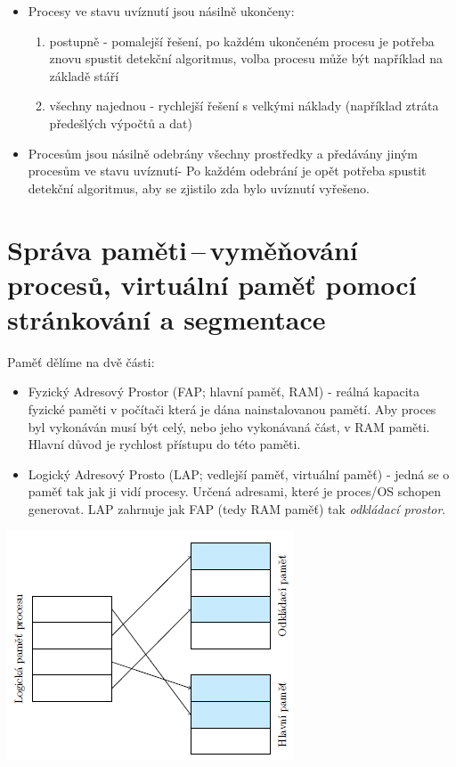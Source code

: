 \begin{itemize}
    \item Procesy ve stavu uvíznutí jsou násilně ukončeny: 
    \begin{enumerate}
        \item postupně - pomalejší řešení, po každém ukončeném procesu je potřeba znovu spustit detekční algoritmus, volba procesu může být například na základě stáří
        \item všechny najednou - rychlejší řešení s velkými náklady (například ztráta předešlých výpočtů a dat)
    \end{enumerate}
    
    \item Procesům jsou násilně odebrány všechny prostředky a předávány jiným procesům ve stavu uvíznutí- Po každém odebrání je opět potřeba spustit detekční algoritmus, aby se zjistilo zda bylo uvíznutí vyřešeno.
\end{itemize}


\newpage
\section{Správa paměti\,--\,vyměňování procesů, virtuální paměť pomocí stránkování a segmentace}

Paměť dělíme na dvě části:
\begin{itemize}
    \item Fyzický Adresový Prostor (FAP; hlavní paměť, RAM) - reálná kapacita fyzické paměti v počítači která je dána nainstalovanou pamětí. Aby proces byl vykonáván musí být celý, nebo jeho vykonávaná část, v RAM paměti. Hlavní důvod je rychlost přístupu do této paměti. 
    \item Logický Adresový Prosto (LAP; vedlejší paměť, virtuální paměť) - jedná se o paměť tak jak ji vidí procesy. Určená adresami, které je proces/OS schopen generovat. LAP zahrnuje jak FAP (tedy RAM paměť) tak \textit{odkládací prostor}.
\end{itemize}

\begin{center}
    \includegraphics[scale=1]{images/mem_lap.png} \label{mem:lap}
\end{center}

